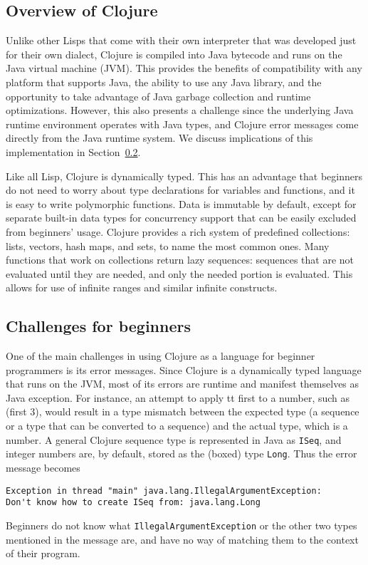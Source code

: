 \documentclass[submission,copyright,creativecommons]{eptcs}
\newcommand{\allcomments}[1]{{#1}}
\newcommand{\emcomment}[1]{{\bf \textcolor{ForestGreen}{\allcomments{{#1}}}}}
\begin{document}
\subsection{Overview of Clojure}\label{subsec:clojure}
%
Unlike other Lisps that come with their own interpreter that was developed just for their own dialect, Clojure is compiled 
into Java bytecode and runs on the Java virtual machine (JVM). This provides the benefits of compatibility with 
any platform that supports Java, the ability to use any Java library, and the opportunity to take advantage of Java 
garbage collection and runtime optimizations. However, this also presents a challenge since the underlying Java 
runtime environment operates with Java types, and Clojure error messages come directly from the Java runtime
system. We discuss implications of this implementation in Section~\ref{subsec:challenges}.

Like all Lisp, Clojure is dynamically typed. This has an advantage that beginners do not need to worry about type declarations
for variables and functions, and it is easy to write polymorphic functions. 
Data is immutable by default, except for separate built-in data types for concurrency support that can be easily 
excluded from beginners' usage. 
Clojure provides a rich system of predefined collections: lists, vectors, hash maps, and sets, to name the 
most common ones. Many functions that work on collections return lazy sequences: sequences that are not evaluated 
until they are needed, and only the needed portion is evaluated. This allows for use of infinite ranges and similar infinite 
constructs. 

\subsection{Challenges for beginners}\label{subsec:challenges}
One of the main challenges in using Clojure as a language for beginner programmers is its error messages. 
Since Clojure is a dynamically typed language that runs on the JVM, most of its errors
are runtime and manifest themselves as Java exception.
For instance, an attempt to apply {tt first} to a number, such as {(first 3)}, 
would result in a type mismatch between the expected type (a sequence or a type that can be converted to a sequence) 
and the actual type, which is a number. A general Clojure sequence type  is represented in Java as 
{\tt ISeq}, and integer numbers are, by default, stored as the (boxed) type {\tt Long}. Thus the error message becomes
\begin{verbatim}
Exception in thread "main" java.lang.IllegalArgumentException:
Don't know how to create ISeq from: java.lang.Long
\end{verbatim}
Beginners do not know what {\tt IllegalArgumentException} or the other two types mentioned in the message are, and have no
way of matching them to the context of their program. 
\end{document}
